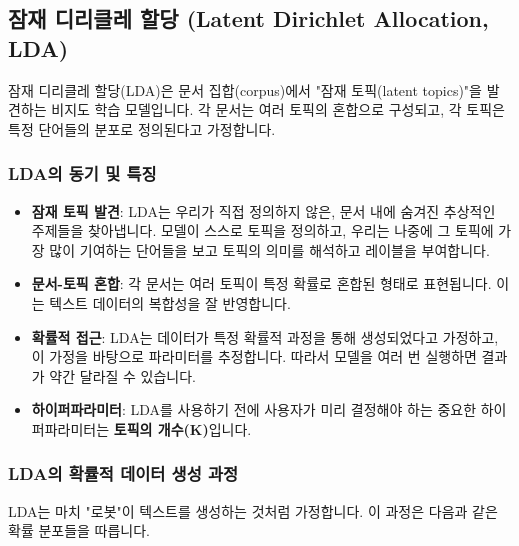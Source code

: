 \documentclass[11pt,a4paper]{article}
\begin{document}
\newpage
\subsection*{잠재 디리클레 할당 (Latent Dirichlet Allocation, LDA)}
\begin{conceptbox}
잠재 디리클레 할당(LDA)은 문서 집합(corpus)에서 "잠재 토픽(latent topics)"을 발견하는 비지도 학습 모델입니다.
각 문서는 여러 토픽의 혼합으로 구성되고, 각 토픽은 특정 단어들의 분포로 정의된다고 가정합니다.
\end{conceptbox}

\subsubsection*{LDA의 동기 및 특징}
\begin{itemize}
    \item \textbf{잠재 토픽 발견}: LDA는 우리가 직접 정의하지 않은, 문서 내에 숨겨진 추상적인 주제들을 찾아냅니다. 모델이 스스로 토픽을 정의하고, 우리는 나중에 그 토픽에 가장 많이 기여하는 단어들을 보고 토픽의 의미를 해석하고 레이블을 부여합니다.
    \item \textbf{문서-토픽 혼합}: 각 문서는 여러 토픽이 특정 확률로 혼합된 형태로 표현됩니다. 이는 텍스트 데이터의 복합성을 잘 반영합니다.
    \item \textbf{확률적 접근}: LDA는 데이터가 특정 확률적 과정을 통해 생성되었다고 가정하고, 이 가정을 바탕으로 파라미터를 추정합니다. 따라서 모델을 여러 번 실행하면 결과가 약간 달라질 수 있습니다.
    \item \textbf{하이퍼파라미터}: LDA를 사용하기 전에 사용자가 미리 결정해야 하는 중요한 하이퍼파라미터는 \textbf{토픽의 개수(K)}입니다.
\end{itemize}

\subsubsection*{LDA의 확률적 데이터 생성 과정}
LDA는 마치 "로봇"이 텍스트를 생성하는 것처럼 가정합니다. 이 과정은 다음과 같은 확률 분포들을 따릅니다.
\end{document}

